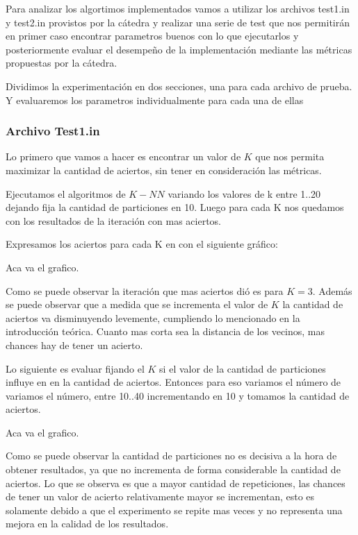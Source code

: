 Para analizar los algortimos implementados vamos a utilizar los archivos test1.in y test2.in provistos por la cátedra y realizar una serie de test que nos permitirán en primer caso encontrar parametros buenos con lo que ejecutarlos y posteriormente evaluar el desempeño de la implementación mediante las métricas propuestas por la cátedra.

Dividimos la experimentación en dos secciones, una para cada archivo de prueba. Y evaluaremos los parametros individualmente para cada una de ellas


\subsubsection {Archivo Test1.in}


Lo primero que vamos a hacer es encontrar un valor de $K$ que nos permita maximizar la cantidad de aciertos, sin tener en consideración las métricas.

Ejecutamos el algoritmos de $K-NN$ variando los valores de k entre {1..20} dejando fija la cantidad de particiones en 10. Luego para cada K nos quedamos con los resultados de la iteración con mas aciertos.

Expresamos los aciertos para cada K en con el siguiente gráfico:



Aca va el grafico.

Como se puede observar la iteración que mas aciertos dió es para $K = 3$. Además se puede observar que a medida que se incrementa el valor de $K$ la cantidad de aciertos va disminuyendo levemente, cumpliendo lo mencionado en la introducción teórica. Cuanto mas corta sea la distancia de los vecinos, mas chances hay de tener un acierto.

Lo siguiente es evaluar fijando el $K$ si el valor de la cantidad de particiones influye en en la cantidad de aciertos. Entonces para eso variamos el número de variamos el número, entre {10..40} incrementando en 10 y tomamos la cantidad de aciertos.

Aca va el grafico.

Como se puede observar la cantidad de particiones no es decisiva a la hora de obtener resultados, ya que no incrementa de forma considerable la cantidad de aciertos. Lo que se observa es que a mayor cantidad de repeticiones, las chances de tener un valor de acierto relativamente mayor se incrementan, esto es solamente debido a que el experimento se repite mas veces y no representa una mejora en la calidad de los resultados.

